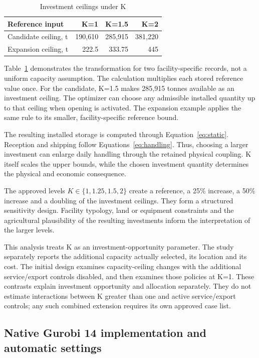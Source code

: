 \documentclass[11pt,a4paper]{article}
\begin{document}
\begin{table}[H]\centering\small
\caption{Investment ceilings under K}\label{tab:Kexample}
\begin{tabular}{lrrr}\toprule
Reference input&K=1&K=1.5&K=2\\\midrule
Candidate ceiling, t&190,610&285,915&381,220\\
Expansion ceiling, t&222.5&333.75&445\\\bottomrule
\end{tabular}
\end{table}

Table~\ref{tab:Kexample} demonstrates the transformation for two facility-specific records, not a uniform capacity assumption. The calculation multiplies each stored reference value once. For the candidate, K=1.5 makes 285,915 tonnes available as an investment ceiling. The optimizer can choose any admissible installed quantity up to that ceiling when opening is activated. The expansion example applies the same rule to its smaller, facility-specific reference bound.

The resulting installed storage is computed through Equation~\eqref{eq:static}. Reception and shipping follow Equations~\eqref{eq:handling}. Thus, choosing a larger investment can enlarge daily handling through the retained physical coupling. K itself scales the upper bounds, while the chosen investment quantity determines the physical and economic consequence.

The approved levels $K\in\{1,1.25,1.5,2\}$ create a reference, a 25\% increase, a 50\% increase and a doubling of the investment ceilings. They form a structured sensitivity design. Facility typology, land or equipment constraints and the agricultural plausibility of the resulting investments inform the interpretation of the larger levels.

This analysis treats K as an investment-opportunity parameter. The study separately reports the additional capacity actually selected, its location and its cost. The initial design examines capacity-ceiling changes with the additional service/export controls disabled, and then examines those policies at K=1. These contrasts explain investment opportunity and allocation separately. They do not estimate interactions between K greater than one and active service/export controls; any such combined extension requires its own approved case list.

\subsection{Native Gurobi 14 implementation and automatic settings}
\label{sec:gurobi}
\end{document}
